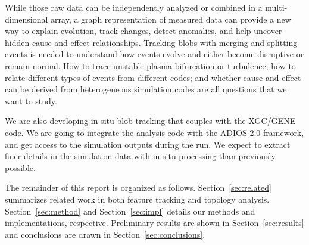 While those raw data can be independently analyzed or combined in a multi-dimensional array, a graph representation of measured data can provide a new way to explain evolution, track changes, detect anomalies, and help uncover hidden cause-and-effect relationships. Tracking blobs with merging and splitting events is needed to understand how events evolve and either become disruptive or remain normal.  How to trace unstable plasma bifurcation or turbulence; how to relate different types of events from different codes; and whether cause-and-effect can be derived from heterogeneous simulation codes are all questions that we want to study.

We are also developing in situ blob tracking that couples with the XGC/GENE code.  We are going to integrate the analysis code with the ADIOS 2.0 framework, and get access to the simulation outputs during the run.  We expect to extract finer details in the simulation data with in situ processing than previously possible.  

The remainder of this report is organized as follows.  Section~\ref{sec:related} summarizes related work in both feature tracking and topology analysis.  Section~\ref{sec:method} and Section~\ref{sec:impl} details our methods and implementations, respective.  Preliminary results are shown in Section~\ref{sec:results} and conclusions are drawn in Section~\ref{sec:conclusions}.  